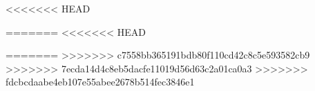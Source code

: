 
\raggedbottom

\tableofcontents





<<<<<<< HEAD



=======
<<<<<<< HEAD

=======
>>>>>>> c7558bb365191bdb80f110cd42c8c5e593582cb9
>>>>>>> 7ecda14d4c8eb5dacfe11019d56d63c2a01ca0a3
>>>>>>> fdcbcdaabe4eb107e55abee2678b514fec3846e1
\begingroup
	\raggedright
	
\endgroup


